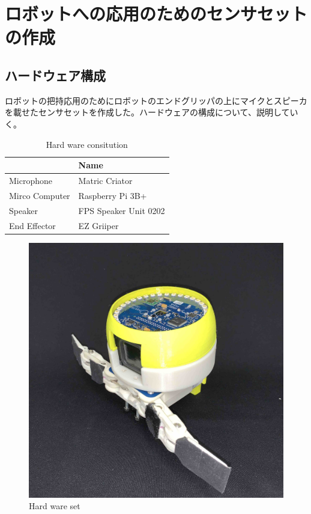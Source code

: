 \section{ロボットへの応用のためのセンサセットの作成}
\label{chap:app_hand}

\subsection{ハードウェア構成}
\label{sec:hard_content}
ロボットの把持応用のためにロボットのエンドグリッパの上にマイクとスピーカを載せたセンサセットを作成した。ハードウェアの構成について、説明していく。

\begin{table}[h]
    \centering
    \caption{Hard ware consitution}
    \vspace{1zh}
    \begin{tabular}{l||l} \hline
         & Name \\ \hline\hline
        Microphone & Matric Criator \\
        Mirco Computer & Raspberry Pi 3B+ \\
        Speaker & FPS Speaker Unit 0202 \\
        End Effector & EZ Griiper \\ \hline
    \end{tabular}
    \label{tab:hand_hard_content}
\end{table}

\begin{figure}[hb]
  \begin{center}
  \vspace{1zh}
    \includegraphics[width=\linewidth]{images/5_sensor_st.jpg}   
  \end{center}
  \caption{Hard ware set}
  \label{fig:hand_hard_image}
\end{figure}

